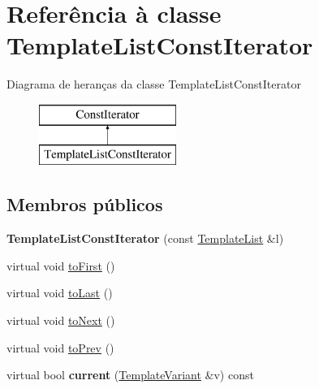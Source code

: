 \hypertarget{class_template_list_const_iterator}{\section{Referência à classe Template\-List\-Const\-Iterator}
\label{class_template_list_const_iterator}
}
Diagrama de heranças da classe Template\-List\-Const\-Iterator\begin{figure}[H]
\begin{center}
\leavevmode
\includegraphics[height=2.000000cm]{class_template_list_const_iterator}
\end{center}
\end{figure}
\subsection*{Membros públicos}
\begin{DoxyCompactItemize}
\item 
\hypertarget{class_template_list_const_iterator_a92767094061c17e14d1112c6a2725339}{{\bfseries Template\-List\-Const\-Iterator} (const \hyperlink{class_template_list}{Template\-List} \&l)}\label{class_template_list_const_iterator_a92767094061c17e14d1112c6a2725339}

\item 
virtual void \hyperlink{class_template_list_const_iterator_a24528c52410032763cedaccdfbe474e5}{to\-First} ()
\item 
virtual void \hyperlink{class_template_list_const_iterator_ac4e23694db19ee84c4e110f9965d64e4}{to\-Last} ()
\item 
virtual void \hyperlink{class_template_list_const_iterator_ad8ecebd1a267185e69e1b6fe4e9f331e}{to\-Next} ()
\item 
virtual void \hyperlink{class_template_list_const_iterator_a3491dc4d8ab54f0a0583ac1941f4e94f}{to\-Prev} ()
\item 
\hypertarget{class_template_list_const_iterator_abb5c01340ac11a79b2b0dc0c1bd4cf29}{virtual bool {\bfseries current} (\hyperlink{class_template_variant}{Template\-Variant} \&v) const }\label{class_template_list_const_iterator_abb5c01340ac11a79b2b0dc0c1bd4cf29}

\end{DoxyCompactItemize}


